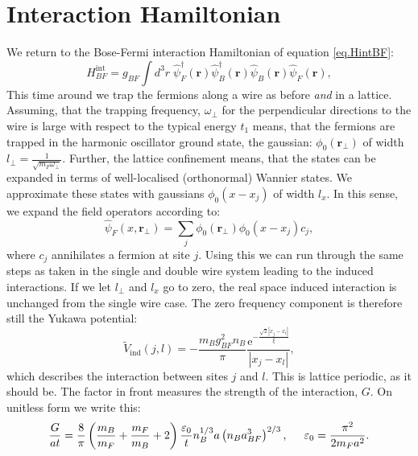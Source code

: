 \section{Interaction Hamiltonian} \label{sec.interaction.lattice}
We return to the Bose-Fermi interaction Hamiltonian of equation \eqref{eq.HintBF}:
\begin{equation}
H_{BF}^\text{int} = g_{BF}\int d^3 r \; \hat{\psi}_F^\dagger(\mathbf{r}) \hat{\psi}_B^\dagger(\mathbf{r})\hat{\psi}_B(\mathbf{r})\hat{\psi}_F(\mathbf{r}),
\end{equation} 
This time around we trap the fermions along a wire as before \textit{and} in a lattice. Assuming, that the trapping frequency, $\omega_{\perp}$ for the perpendicular directions to the wire is large with respect to the typical energy $t_1$ means, that the fermions are trapped in the harmonic oscillator ground state, the gaussian: $\phi_0(\mathbf{r}_{\perp})$ of width $l_{\perp} = \frac{1}{\sqrt{m_F\omega_{\perp}}}$. Further, the lattice confinement means, that the states can be expanded in terms of well-localised (orthonormal) Wannier states. We approximate these states with gaussians $\phi_0(x - x_j)$ of width $l_x$. In this sense, we expand the field operators according to:
\begin{equation}
\hat{\psi}_F(x, \mathbf{r}_{\perp}) = \sum_j \phi_0(\mathbf{r}_{\perp})\phi_0(x - x_j) c_j, 
\end{equation}
where $c_j$ annihilates a fermion at site $j$. Using this we can run through the same steps as taken in the single and double wire system leading to the induced interactions. If we let $l_{\perp}$ and $l_x$ go to zero, the real space induced interaction is unchanged from the single wire case. The zero frequency component is therefore still the Yukawa potential:
\begin{equation}
\tilde{V}_{\text{ind}}(j, l) = -\frac{m_Bg_{BF}^2n_B}{\pi}\frac{\text{e}^{-\frac{\sqrt{2}|x_j - x_l|}{\xi}}}{|x_j - x_l|},
\label{eq.Vindx.lattice}
\end{equation}
which describes the interaction between sites $j$ and $l$. This is lattice periodic, as it should be. The factor in front measures the strength of the interaction, $G$. On unitless form we write this:
\begin{equation}
\frac{G}{at} = \frac{8}{\pi}\left( \frac{m_B}{m_F} + \frac{m_F}{m_B} + 2 \right) \frac{\varepsilon_0}{t} n_B^{1/3}a \left(n_B a^3_{BF}\right)^{2 / 3}, \hspace{0.5cm} \varepsilon_0 = \frac{\pi^2}{2m_Fa^2}.
\label{eq.interactionstrength.lattice}
\end{equation}
